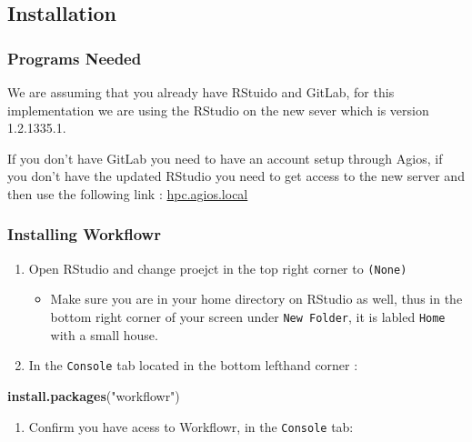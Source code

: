 \documentclass[]{book}
\newenvironment{Shaded}{\begin{snugshade}}{\end{snugshade}}
\newcommand{\KeywordTok}[1]{\textcolor[rgb]{0.13,0.29,0.53}{\textbf{#1}}}
\newcommand{\NormalTok}[1]{#1}
\newcommand{\StringTok}[1]{\textcolor[rgb]{0.31,0.60,0.02}{#1}}
\providecommand{\tightlist}{%
  \setlength{\itemsep}{0pt}\setlength{\parskip}{0pt}}
\begin{document}
\hypertarget{installation}{%
\subsection{Installation}\label{installation}}

\hypertarget{programs-needed}{%
\subsubsection{Programs Needed}\label{programs-needed}}

We are assuming that you already have RStuido and GitLab, for this implementation we are using the RStudio on the new sever which is version 1.2.1335.1.

If you don't have GitLab you need to have an account setup through Agios, if you don't have the updated RStudio you need to get access to the new server and then use the following link : \href{https://hpc.agios.local}{hpc.agios.local}

\hypertarget{installing-workflowr}{%
\subsubsection{Installing Workflowr}\label{installing-workflowr}}

\begin{enumerate}
\def\labelenumi{\arabic{enumi}.}
\tightlist
\item
  Open RStudio and change proejct in the top right corner to \texttt{(None)}

  \begin{itemize}
  \tightlist
  \item
    Make sure you are in your home directory on RStudio as well, thus in the bottom right corner of your screen under \texttt{New\ Folder}, it is labled \texttt{Home} with a small house.
  \end{itemize}
\item
  In the \texttt{Console} tab located in the bottom lefthand corner :
\end{enumerate}

\begin{Shaded}
\begin{Highlighting}[]
\KeywordTok{install.packages}\NormalTok{(}\StringTok{"workflowr"}\NormalTok{)}
\end{Highlighting}
\end{Shaded}

\begin{enumerate}
\def\labelenumi{\arabic{enumi}.}
\setcounter{enumi}{2}
\tightlist
\item
  Confirm you have acess to Workflowr, in the \texttt{Console} tab:
\end{enumerate}
\end{document}
